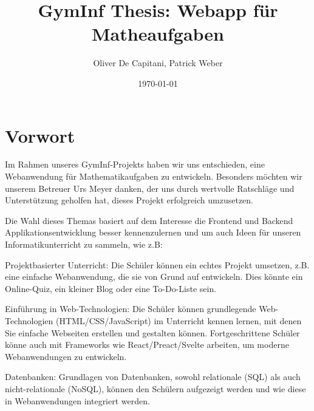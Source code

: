 \documentclass[12pt,a4paper]{article} %
\title{GymInf Thesis: Webapp für Matheaufgaben}
\date{\today}
\author{Oliver De Capitani, Patrick Weber}
\begin{document}
\maketitle %
% 



\newpage %
\tableofcontents %




\newpage



\section{Vorwort}


Im Rahmen unseres GymInf-Projekts haben wir uns entschieden, eine Webanwendung für Mathematikaufgaben zu entwickeln. Besonders möchten wir unserem Betreuer Urs Meyer danken, der uns durch wertvolle Ratschläge und Unterstützung geholfen hat, dieses Projekt erfolgreich umzusetzen.

Die Wahl dieses Themas basiert auf dem Interesse die Frontend und Backend Applikationsentwicklung besser kennenzulernen und um auch Ideen für unseren Informatikunterricht zu sammeln, wie z.B:

Projektbasierter Unterricht: Die Schüler können ein echtes Projekt umsetzen, z.B. eine einfache Webanwendung, die sie von Grund auf entwickeln. Dies könnte ein Online-Quiz, ein kleiner Blog oder eine To-Do-Liste sein.

Einführung in Web-Technologien: Die Schüler können grundlegende Web-Technologien (HTML/CSS/JavaScript) im Unterricht kennen lernen, mit denen Sie einfache Webseiten erstellen und gestalten können. Fortgeschrittene Schüler könne auch mit Frameworks wie React/Preact/Svelte arbeiten, um moderne Webanwendungen zu entwickeln.

Datenbanken: Grundlagen von Datenbanken, sowohl relationale (SQL) als auch nicht-relationale (NoSQL), können den Schülern aufgezeigt werden und wie diese in Webanwendungen integriert werden.
\end{document}
